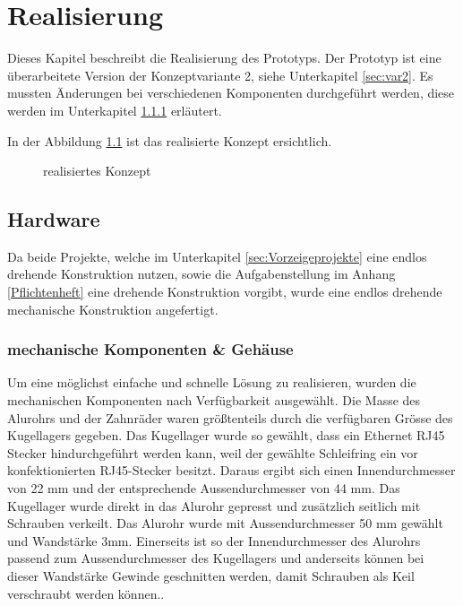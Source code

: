 \chapter{Realisierung}
\label{chap:Realisierung}

Dieses Kapitel beschreibt die Realisierung des Prototyps. Der Prototyp ist eine überarbeitete Version der Konzeptvariante 2, siehe Unterkapitel \ref{sec:var2}. Es mussten Änderungen bei verschiedenen Komponenten durchgeführt werden, diese werden im Unterkapitel \ref{sec:mechKomp} erläutert. 

In der Abbildung \ref{fig:realisierung} ist das realisierte Konzept ersichtlich.

\begin{figure}[H]
	\centering
	\caption[realisiertes Konzept]{realisiertes Konzept}
	\label{fig:realisierung}
\end{figure} 


\section {Hardware}
\label{sec:Hardware}

Da beide Projekte, welche im Unterkapitel \ref{sec:Vorzeigeprojekte} eine endlos drehende Konstruktion nutzen, sowie die Aufgabenstellung im Anhang \ref{Pflichtenheft} eine drehende Konstruktion vorgibt, wurde eine endlos drehende mechanische Konstruktion angefertigt. 

\subsection {mechanische Komponenten \& Gehäuse}
\label{sec:mechKomp}

Um eine möglichst einfache und schnelle Lösung zu realisieren, wurden die mechanischen Komponenten nach Verfügbarkeit ausgewählt. Die Masse des Alurohrs und der Zahnräder waren größtenteils durch die verfügbaren Grösse des Kugellagers gegeben. Das Kugellager wurde so gewählt, dass ein Ethernet RJ45 Stecker hindurchgeführt werden kann, weil der gewählte Schleifring ein vor konfektionierten RJ45-Stecker besitzt. Daraus ergibt sich einen Innendurchmesser von 22 mm und der entsprechende Aussendurchmesser von 44 mm.
Das Kugellager wurde direkt in das Alurohr gepresst und zusätzlich seitlich mit Schrauben verkeilt. Das Alurohr wurde mit Aussendurchmesser 50 mm gewählt und Wandstärke 3mm. Einerseits ist so der Innendurchmesser des Alurohrs passend zum Aussendurchmesser des Kugellagers und anderseits können bei dieser Wandstärke Gewinde geschnitten werden, damit Schrauben als Keil verschraubt werden können..

